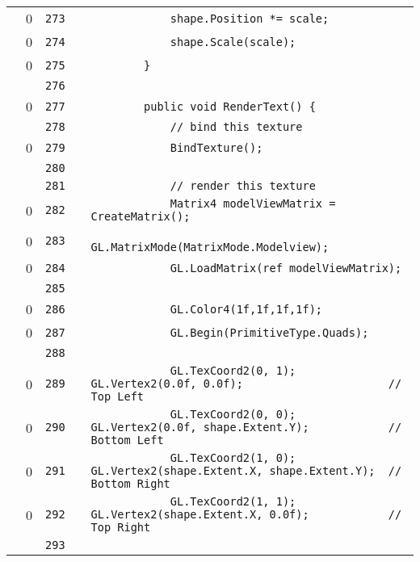 \documentclass[a4paper,landscape,10pt]{article}
\begin{document}
\begin{longtable}[l]{lrrll}
\cellcolor{red} & 0 & \verb~273~ & & \verb~            shape.Position *= scale;~\\
\cellcolor{red} & 0 & \verb~274~ & & \verb~            shape.Scale(scale);~\\
\cellcolor{red} & 0 & \verb~275~ & & \verb~        }~\\
\cellcolor{gray} &  & \verb~276~ & & \verb~~\\
\cellcolor{red} & 0 & \verb~277~ & & \verb~        public void RenderText() {~\\
\cellcolor{gray} &  & \verb~278~ & & \verb~            // bind this texture~\\
\cellcolor{red} & 0 & \verb~279~ & & \verb~            BindTexture();~\\
\cellcolor{gray} &  & \verb~280~ & & \verb~~\\
\cellcolor{gray} &  & \verb~281~ & & \verb~            // render this texture~\\
\cellcolor{red} & 0 & \verb~282~ & & \verb~            Matrix4 modelViewMatrix = CreateMatrix();~\\
\cellcolor{red} & 0 & \verb~283~ & & \verb~            GL.MatrixMode(MatrixMode.Modelview);~\\
\cellcolor{red} & 0 & \verb~284~ & & \verb~            GL.LoadMatrix(ref modelViewMatrix);~\\
\cellcolor{gray} &  & \verb~285~ & & \verb~~\\
\cellcolor{red} & 0 & \verb~286~ & & \verb~            GL.Color4(1f,1f,1f,1f);~\\
\cellcolor{red} & 0 & \verb~287~ & & \verb~            GL.Begin(PrimitiveType.Quads);~\\
\cellcolor{gray} &  & \verb~288~ & & \verb~~\\
\cellcolor{red} & 0 & \verb~289~ & & \verb~            GL.TexCoord2(0, 1); GL.Vertex2(0.0f, 0.0f);                      // Top Left~\\
\cellcolor{red} & 0 & \verb~290~ & & \verb~            GL.TexCoord2(0, 0); GL.Vertex2(0.0f, shape.Extent.Y);            // Bottom Left~\\
\cellcolor{red} & 0 & \verb~291~ & & \verb~            GL.TexCoord2(1, 0); GL.Vertex2(shape.Extent.X, shape.Extent.Y);  // Bottom Right~\\
\cellcolor{red} & 0 & \verb~292~ & & \verb~            GL.TexCoord2(1, 1); GL.Vertex2(shape.Extent.X, 0.0f);            // Top Right~\\
\cellcolor{gray} &  & \verb~293~ & & \verb~~\\

\end{longtable}
\end{document}
